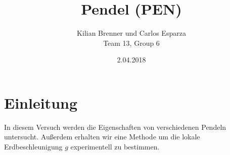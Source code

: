 \documentclass[12pt,a4paper]{article}
\title{Pendel (PEN)}
\author{Kilian Brenner und Carlos Esparza \\ Team 13, Group 6}
\date{2.04.2018}
\begin{document}
\maketitle
\tableofcontents
\newpage

\section{Einleitung}
In diesem Versuch werden die Eigenschaften von verschiedenen Pendeln untersucht. Außerdem erhalten wir eine Methode um die lokale Erdbeschleunigung $g$ experimentell zu bestimmen. 











%
\end{document}
